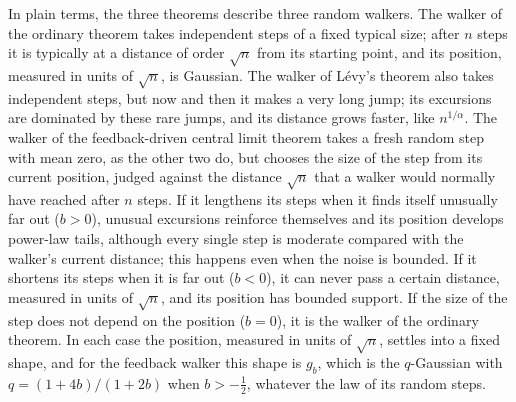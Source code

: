 \documentclass[aip,jmp,preprint,onecolumn,floatfix,superscriptaddress,nofootinbib,11pt]{revtex4-2}
\theoremstyle{plain}
\theoremstyle{remark}
\numberwithin{equation}{section}
\begin{document}
In plain terms, the three theorems describe three random walkers. The walker of the ordinary theorem takes independent steps of a fixed typical size; after $n$ steps it is typically at a distance of order $\sqrt n$ from its starting point, and its position, measured in units of $\sqrt n$, is Gaussian. The walker of L\'evy's theorem also takes independent steps, but now and then it makes a very long jump; its excursions are dominated by these rare jumps, and its distance grows faster, like $n^{1/\alpha}$. The walker of the feedback-driven central limit theorem takes a fresh random step with mean zero, as the other two do, but chooses the size of the step from its current position, judged against the distance $\sqrt n$ that a walker would normally have reached after $n$ steps. If it lengthens its steps when it finds itself unusually far out ($b>0$), unusual excursions reinforce themselves and its position develops power-law tails, although every single step is moderate compared with the walker's current distance; this happens even when the noise is bounded. If it shortens its steps when it is far out ($b<0$), it can never pass a certain distance, measured in units of $\sqrt n$, and its position has bounded support. If the size of the step does not depend on the position ($b=0$), it is the walker of the ordinary theorem. In each case the position, measured in units of $\sqrt n$, settles into a fixed shape, and for the feedback walker this shape is $g_b$, which is the $q$-Gaussian with $q=(1+4b)/(1+2b)$ when $b>-\tfrac12$, whatever the law of its random steps.
\end{document}

